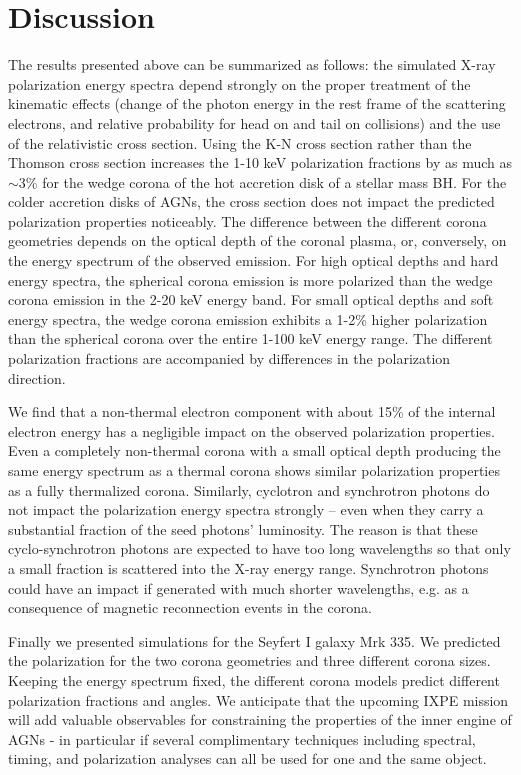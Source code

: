 \documentclass[manuscript]{aastex}
\begin{document}
\section{Discussion}\label{sum}
The results presented above can be summarized as follows: the simulated X-ray polarization energy spectra
depend strongly on the proper treatment of the kinematic effects (change of the photon energy in the rest frame of the
scattering electrons, and relative probability for head on and tail on collisions) and the use of the 
relativistic cross section.
Using the K-N cross section rather than the Thomson cross section increases the 1-10 keV polarization fractions 
by as much as $\sim$3\% for the wedge corona of the hot accretion disk of a stellar mass BH. 
For the colder accretion disks of AGNs, the cross section does not impact the predicted polarization properties
noticeably. The difference between the different corona geometries depends on the optical depth of the coronal plasma,
or, conversely, on the energy spectrum of the observed emission. For high optical depths and hard energy spectra, 
the spherical corona emission is more polarized than the wedge corona emission in the 2-20 keV energy band.
For small optical depths and soft energy spectra, the wedge corona emission exhibits a 1-2\% higher polarization than
the spherical corona over the entire 1-100 keV energy range. The different polarization fractions are accompanied
by differences in the polarization direction.

We find that a non-thermal electron component with about 15\% of the internal electron energy has a negligible
impact on the observed polarization properties. Even a completely non-thermal corona with a small optical depth 
producing the same energy spectrum as a thermal corona shows similar polarization properties as a fully thermalized corona.
Similarly, cyclotron and synchrotron photons do not impact the polarization energy spectra strongly -- 
even when they carry a substantial fraction of the seed photons' luminosity.    
The reason is that these cyclo-synchrotron photons are expected to have too long wavelengths so that only a small fraction
is scattered into the X-ray energy range. Synchrotron photons could have an impact if generated 
with much shorter wavelengths, e.g. as a consequence of magnetic reconnection events in the corona.   

Finally we presented simulations for the Seyfert I galaxy Mrk 335. We predicted the polarization for the two corona geometries and three different corona sizes. Keeping the energy spectrum fixed, the different corona models
predict different polarization fractions and angles. We anticipate that the upcoming IXPE mission will  add valuable
observables for constraining the properties of the inner engine of AGNs - in particular if several complimentary techniques
including spectral, timing, and polarization analyses can all be used for one and the same object.  
%
\end{document}
